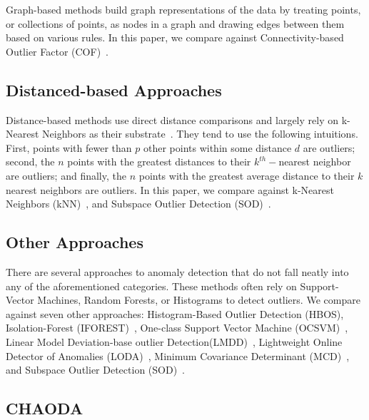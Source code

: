 Graph-based methods build graph representations of the data by treating points, or collections of points, as nodes in a graph and drawing edges between them based on various rules.
In this paper, we compare against Connectivity-based Outlier Factor (COF)~\cite{tang2002cof}.


\subsection{Distanced-based Approaches}
\label{subsec:related-works:distanced-based-approaches}

Distance-based methods use direct distance comparisons and largely rely on k-Nearest Neighbors as their substrate~\cite{wang2019progress}.
They tend to use the following intuitions.
First, points with fewer than $p$ other points within some distance $d$ are outliers;
second, the $n$ points with the greatest distances to their $k^{th}-$nearest neighbor are outliers;
and finally, the $n$ points with the greatest average distance to their $k$ nearest neighbors are outliers.
In this paper, we compare against
k-Nearest Neighbors (kNN)~\cite{ramaswamy2000efficient, sridhar2000knn, fabrizio2002knn}, and
Subspace Outlier Detection (SOD)~\cite{kriegel2009sod}.


\subsection{Other Approaches}
\label{subsec:introduction:other-appraoches}

There are several approaches to anomaly detection that do not fall neatly into any of the aforementioned categories.
These methods often rely on Support-Vector Machines, Random Forests, or Histograms to detect outliers.
We compare against seven other approaches:
Histogram-Based Outlier Detection (HBOS)\cite{goldstein2012histogram},
Isolation-Forest (IFOREST)~\cite{tony2008iforest,tony2012iforest},
One-class Support Vector Machine (OCSVM)~\cite{sholkopf2001ocsvm},
Linear Model Deviation-base outlier Detection(LMDD)~\cite{arning1996linear},
Lightweight Online Detector of Anomalies (LODA)~\cite{pevny2016loda},
Minimum Covariance Determinant (MCD)~\cite{rousseeuw1999mcd,hardin2004mcd}, and
Subspace Outlier Detection (SOD)~\cite{kriegel2009sod}.


\subsection{CHAODA}
\label{subsec:introduction:chaoda}

